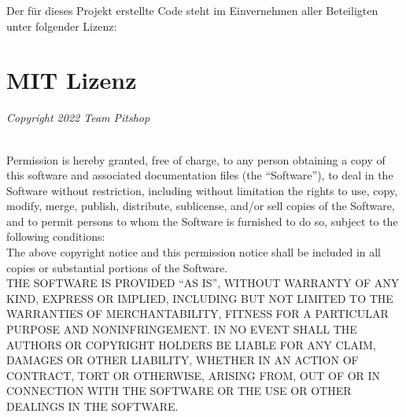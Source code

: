 \documentclass[
ngerman,
accentcolor=2d,
marginpar=false,
class=report,
fontsize=11pt,
ruledheaders=section,
]{tudapub}
\begin{document}
Der für dieses Projekt erstellte Code steht im Einvernehmen aller Beteiligten unter folgender Lizenz:\\

\section{MIT Lizenz}


\textit{Copyright 2022 Team Pitshop}
\\\

\noindent
Permission is hereby granted, free of charge, to any person obtaining a copy of this software and associated documentation files (the ``Software''), to deal in the Software without restriction, including without limitation the rights to use, copy, modify, merge, publish, distribute, sublicense, and/or sell copies of the Software, and to permit persons to whom the Software is furnished to do so, subject to the following conditions: \\

The above copyright notice and this permission notice shall be included in all copies or substantial portions of the Software. \\


\noindent
THE SOFTWARE IS PROVIDED ``AS IS'', WITHOUT WARRANTY OF ANY KIND, EXPRESS OR IMPLIED, INCLUDING BUT NOT LIMITED TO THE WARRANTIES OF MERCHANTABILITY, FITNESS FOR A PARTICULAR PURPOSE AND NONINFRINGEMENT. IN NO EVENT SHALL THE AUTHORS OR COPYRIGHT HOLDERS BE LIABLE FOR ANY CLAIM, DAMAGES OR OTHER LIABILITY, WHETHER IN AN ACTION OF CONTRACT, TORT OR OTHERWISE, ARISING FROM, OUT OF OR IN CONNECTION WITH THE SOFTWARE OR THE USE OR OTHER DEALINGS IN THE SOFTWARE.
\end{document}
